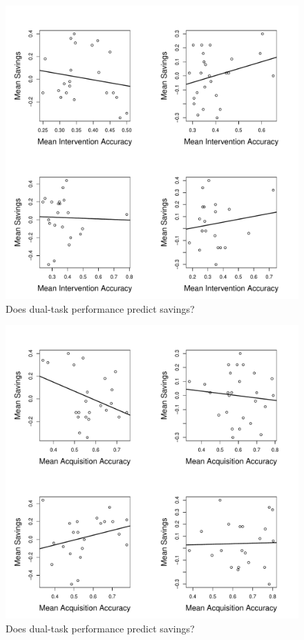 \begin{figure}[t]
  \centering \includegraphics[width=1.0\textwidth]{../figures/fig_savings_int.pdf}
  \caption{
    Does dual-task performance predict savings?
  }
  \label{fig:savings_int}
\end{figure}

\begin{figure}[t]
  \centering \includegraphics[width=1.0\textwidth]{../figures/fig_savings_ac.pdf}
  \caption{
    Does dual-task performance predict savings?
  }
  \label{fig:savings_ac}
\end{figure}

